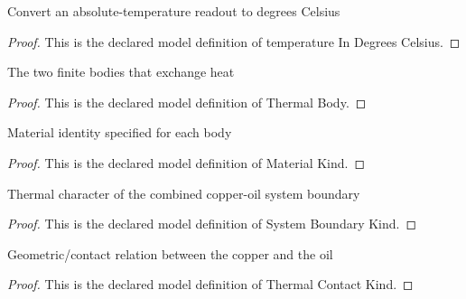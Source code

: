 \begin{definition}
  \label{def:physics:phyx-mini-0455:phyxminiproblems-problemphyxmini0455-temperatureindegreescelsius}
  Convert an absolute-temperature readout to degrees Celsius
\end{definition}
\begin{proof}
  This is the declared model definition of temperature In Degrees Celsius.
\end{proof}
\begin{definition}
  \label{def:physics:phyx-mini-0455:phyxminiproblems-problemphyxmini0455-thermalbody}
  The two finite bodies that exchange heat
\end{definition}
\begin{proof}
  This is the declared model definition of Thermal Body.
\end{proof}
\begin{definition}
  \label{def:physics:phyx-mini-0455:phyxminiproblems-problemphyxmini0455-materialkind}
  Material identity specified for each body
\end{definition}
\begin{proof}
  This is the declared model definition of Material Kind.
\end{proof}
\begin{definition}
  \label{def:physics:phyx-mini-0455:phyxminiproblems-problemphyxmini0455-systemboundarykind}
  Thermal character of the combined copper-oil system boundary
\end{definition}
\begin{proof}
  This is the declared model definition of System Boundary Kind.
\end{proof}
\begin{definition}
  \label{def:physics:phyx-mini-0455:phyxminiproblems-problemphyxmini0455-thermalcontactkind}
  Geometric/contact relation between the copper and the oil
\end{definition}
\begin{proof}
  This is the declared model definition of Thermal Contact Kind.
\end{proof}
